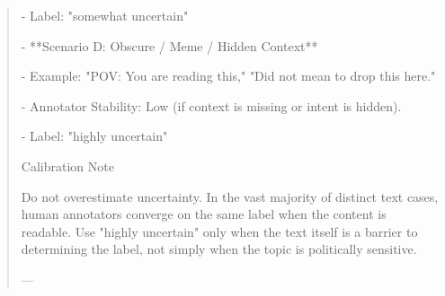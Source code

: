 \begin{quote}
  - Label: "somewhat uncertain"



- **Scenario D: Obscure / Meme / Hidden Context**

  - Example: "POV: You are reading this," "Did not mean to drop this here."

  - Annotator Stability: Low (if context is missing or intent is hidden).

  - Label: "highly uncertain"



Calibration Note

Do not overestimate uncertainty. In the vast majority of distinct text cases, human annotators converge on the same label when the content is readable. Use "highly uncertain" only when the text itself is a barrier to determining the label, not simply when the topic is politically sensitive.



---
\end{quote}
